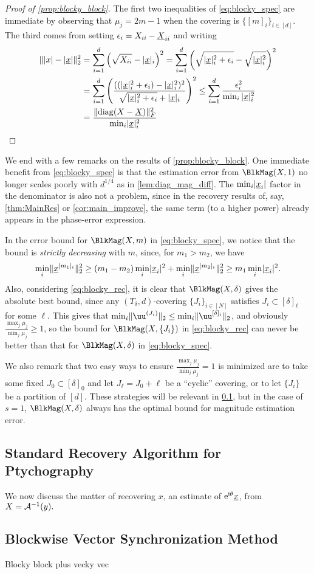 \begin{proof}[Proof of \cref{prop:blocky_block}]
  The first two inequalities of \eqref{eq:blocky_spec} are immediate by observing that $\mu_j = 2m - 1$ when the covering is $\{[m]_i\}_{i \in [d]}$.  The third comes from setting $\epsilon_i = X_{ii} - \underline{X}_{ii}$ and writing
  \begin{align*}
    \lVert\lvert x\rvert - \lvert\underline{x}\rvert\rVert_2^2 &= \sum_{i = 1}^d \left(\sqrt{X_{ii}} - \lvert\underline{x}\rvert_i\right)^2 = \sum_{i = 1}^d \left(\sqrt{\lvert\underline{x}\rvert_i^2 + \epsilon_i} - \sqrt{\lvert\underline{x}\rvert_i^2}\right)^2 \\
    &= \sum_{i = 1}^d \left(\frac{((\lvert\underline{x}\rvert_i^2 + \epsilon_i) - \lvert\underline{x}\rvert_i^2)^2}{\sqrt{\lvert\underline{x}\rvert_i^2 + \epsilon_i} + \lvert\underline{x}\rvert_i}\right)^2 \le \sum_{i = 1}^d \frac{\epsilon_i^2}{\min_i{\lvert\underline{x}\rvert_i^2}} \\ &= \frac{\lVert\operatorname{diag}(X - \underline{X})\rVert_F^2}{\min_i \lvert\underline{x}\rvert_i^2}
  \end{align*}  
\end{proof}

We end with a few remarks on the results of \cref{prop:blocky_block}.  One immediate benefit from \cref{eq:blocky_spec} is that the estimation error from $\BlkMag(X, 1)$ no longer scales poorly with $d^{1/4}$ as in \cref{lem:diag_mag_diff}.  The $\min_i \lvert\underline{x}_i\rvert$ factor in the denominator is also not a problem, since in the recovery results of, say, \cref{thm:MainRes} or \cref{cor:main_improve}, the same term (to a higher power) already appears in the phase-error expression.

In the error bound for $\BlkMag(X, m)$ in \cref{eq:blocky_spec}, we notice that the bound is \emph{strictly decreasing} with $m$, since, for $m_1 > m_2$, we have \[\min_i \lVert\underline{x}^{[m_1]_i}\rVert_2^2 \ge (m_1 - m_2) \min_i \lvert\underline{x}_i\rvert^2 + \min_i \lVert\underline{x}^{[m_2]_i}\rVert_2^2 \ge m_1 \min_i \lvert\underline{x}_i\rvert^2.\]  Also, considering \eqref{eq:blocky_rec}, it is clear that $\BlkMag(X, \delta)$ gives the absolute best bound, since any $(T_\delta, d)$-covering $\{J_i\}_{i \in [N]}$ satisfies $J_i \subset [\delta]_\ell$ for some $\ell$.  This gives that $\min_i \norm{\uu^{(J_i)}}_2 \le \min_i \norm{\uu^{[\delta]_i}}_2$, and obviously $\frac{\max_j \mu_j}{\min_j \mu_j} \ge 1$, so the bound for $\BlkMag(X, \{J_i\})$ in \eqref{eq:blocky_rec} can never be better than that for $\BlkMag(X, \delta)$ in \eqref{eq:blocky_spec}.

We also remark that two easy ways to ensure $\frac{\max_j \mu_j}{\min_j \mu_j} = 1$ is minimized are to take some fixed $J_0 \subset [\delta]_0$ and let $J_\ell = J_0 + \ell$ be a ``cyclic'' covering, or to let $\{J_i\}$ be a partition of $[d]$.  These strategies will be relevant in \cref{sec:pty_std_rec}, but in the case of $s = 1$, $\BlkMag(X, \delta)$ always has the optimal bound for magnitude estimation error.

\subsection{Standard Recovery Algorithm for Ptychography}
\label{sec:pty_std_rec}
We now discuss the matter of recovering $x$, an estimate of $\mathrm{e}^{\mathrm{i} \theta} \underline{x}$, from $X = \mathcal{A}^{-1}(y).$

\subsection{Blockwise Vector Synchronization Method}
\label{sec:pty_vec_sync}
Blocky block plus vecky vec
